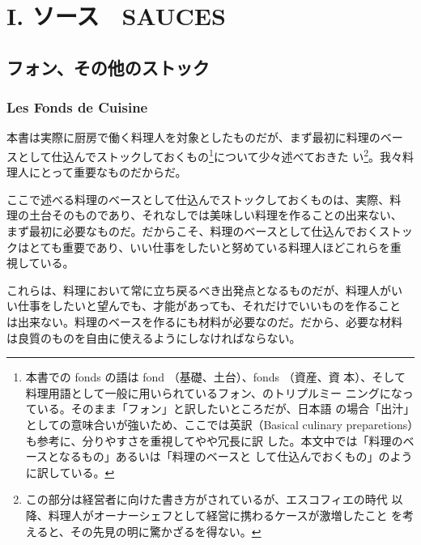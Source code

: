 \documentclass[twoside,12Q,b5j]{escoffierltjsbook}
\date{}
\renewcommand{\thechapter}{}
\renewcommand{\thesection}{}
\begin{document}







\chapter{I. ソース　SAUCES}\label{sauce}

\section{フォン、その他のストック}\label{ux30d5ux30a9ux30f3ux305dux306eux4ed6ux306eux30b9ux30c8ux30c3ux30af}

\subsection{Les Fonds de Cuisine}\label{les-fonds-de-cuisine}

 

本書は実際に厨房で働く料理人を対象としたものだが、まず最初に料理のベー
スとして仕込んでストックしておくもの\footnote{本書での fonds の語は fond
  （基礎、土台）、fonds （資産、資
  本）、そして料理用語として一般に用いられているフォン、のトリプルミー
  ニングになっている。そのまま「フォン」と訳したいところだが、日本語
  の場合「出汁」としての意味合いが強いため、ここでは英訳（Basical
  culinary preparetions）も参考に、分りやすさを重視してやや冗長に訳
  した。本文中では「料理のベースとなるもの」あるいは「料理のベースと
  して仕込んでおくもの」のように訳している。}について少々述べておきた
い\footnote{この部分は経営者に向けた書き方がされているが、エスコフィエの時代
  以降、料理人がオーナーシェフとして経営に携わるケースが激増したこと
  を考えると、その先見の明に驚かざるを得ない。}。我々料理人にとって重要なものだからだ。

ここで述べる料理のベースとして仕込んでストックしておくものは、実際、料
理の土台そのものであり、それなしでは美味しい料理を作ることの出来ない、
まず最初に必要なものだ。だからこそ、料理のベースとして仕込んでおくストッ
クはとても重要であり、いい仕事をしたいと努めている料理人ほどこれらを重
視している。

これらは、料理において常に立ち戻るべき出発点となるものだが、料理人がい
い仕事をしたいと望んでも、才能があっても、それだけでいいものを作ること
は出来ない。料理のベースを作るにも材料が必要なのだ。だから、必要な材料
は良質のものを自由に使えるようにしなければならない。
\end{document}
